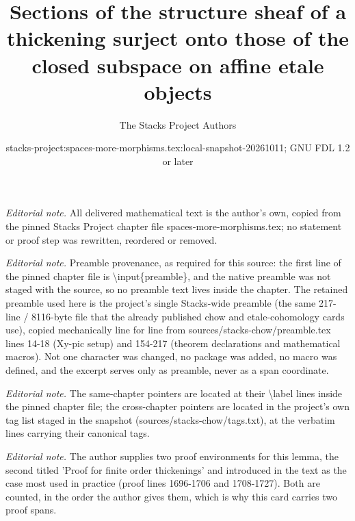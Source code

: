 \documentclass[10pt,a4paper]{amsart}
\title{Sections of the structure sheaf of a thickening surject onto those of the closed subspace on affine etale objects}
\author{The Stacks Project Authors}
\date{stacks-project:spaces-more-morphisms.tex:local-snapshot-20261011; GNU FDL 1.2 or later}
\theoremstyle{plain}
\theoremstyle{definition}
\theoremstyle{remark}
\numberwithin{equation}{subsection}
\begin{document}
\maketitle
\noindent\textit{Editorial note.} All delivered mathematical text is the author's own, copied from the pinned Stacks Project chapter file spaces-more-morphisms.tex; no statement or proof step was rewritten, reordered or removed.\par\medskip
\noindent\textit{Editorial note.} Preamble provenance, as required for this source: the first line of the pinned chapter file is \textbackslash{}input\{preamble\}, and the native preamble was not staged with the source, so no preamble text lives inside the chapter. The retained preamble used here is the project's single Stacks-wide preamble (the same 217-line / 8116-byte file that the already published chow and etale-cohomology cards use), copied mechanically line for line from sources/stacks-chow/preamble.tex lines 14-18 (Xy-pic setup) and 154-217 (theorem declarations and mathematical macros). Not one character was changed, no package was added, no macro was defined, and the excerpt serves only as preamble, never as a span coordinate.\par\medskip
\noindent\textit{Editorial note.} The same-chapter pointers are located at their \textbackslash{}label lines inside the pinned chapter file; the cross-chapter pointers are located in the project's own tag list staged in the snapshot (sources/stacks-chow/tags.txt), at the verbatim lines carrying their canonical tags.\par\medskip
\noindent\textit{Editorial note.} The author supplies two proof environments for this lemma, the second titled 'Proof for finite order thickenings' and introduced in the text as the case most used in practice (proof lines 1696-1706 and 1708-1727). Both are counted, in the order the author gives them, which is why this card carries two proof spans.\par\medskip
\end{document}
